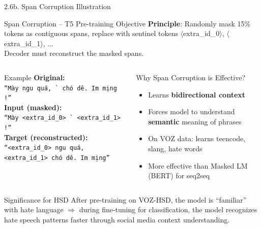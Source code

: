\documentclass[11pt, aspectratio=169]{beamer}
\begin{document}
\begin{frame}[shrink=8]{2.6b. Span Corruption Illustration}

\begin{block}{Span Corruption -- T5 Pre-training Objective}
  \textbf{Principle}: Randomly mask 15\% tokens as contiguous spans, replace with sentinel tokens $\langle$extra\_id\_0$\rangle$, $\langle$extra\_id\_1$\rangle$, ...\\ Decoder must reconstruct the masked spans.
\end{block}

\vspace{0.2cm}
\begin{columns}[T]
  \begin{block}{Example}
    \scriptsize
    \textbf{Original:}\\
    \texttt{``M\`ay ngu qu\'a, \dj\`\ocircumflex{} ch\'o d\^e. Im mi\d\ecircumflex{}ng \dji!''}\\[0.3em]
    \textbf{Input (masked):}\\
    \texttt{``M\`ay <extra\_id\_0> \dj\`\ocircumflex{} <extra\_id\_1> \dji!''}\\[0.3em]
    \textbf{Target (reconstructed):}\\
    \texttt{``<extra\_id\_0> ngu qu\'a, <extra\_id\_1> ch\'o d\^e. Im mi\d\ecircumflex{}ng''}
  \end{block}

  \begin{block}{Why Span Corruption is Effective?}
    \begin{itemize}
      \item Learns \textbf{bidirectional context}
      \item Forces model to understand \textbf{semantic} meaning of phrases
      \item On VOZ data: learns teencode, slang, hate words
      \item More effective than Masked LM (BERT) for seq2seq
    \end{itemize}
  \end{block}
\end{columns}

\vspace{0.2cm}
\begin{block}{Significance for HSD}
  After pre-training on VOZ-HSD, the model is ``familiar'' with hate language $\Rightarrow$ during fine-tuning for classification, the model recognizes hate speech patterns faster through social media context understanding.
\end{block}
\end{frame}
\end{document}
